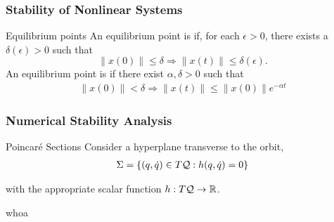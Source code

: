 \begin{frame}
  \frametitle{Stability of Nonlinear Systems}
  \begin{block}{Equilibrium points}
    An equilibrium point is  if, for each $\epsilon > 0$, there exists a $\delta(\epsilon) > 0$ such that $$\|x(0)\| \leq \delta \Rightarrow \|x(t)\| \leq \delta(\epsilon).$$
    An equilibrium point is  if there exist $\alpha, \delta > 0$ such that
    \begin{align*}
      \|x(0)\| < \delta \Rightarrow \| x(t) \| \leq \| x(0) \| e^{-\alpha t}
    \end{align*}
  \end{block}
\end{frame}

\begin{frame}
  \frametitle{Numerical Stability Analysis}
  \begin{block}{Poincar\'e Sections}
    Consider a hyperplane transverse to the orbit,
    \begin{align*}
      \Sigma = \left\{ (q, {\dot q}) \in T\mathcal{Q} : h(q, \dot q) = 0\right\}
    \end{align*}
  \end{block}
  with the appropriate scalar function $h : T\mathcal{Q} \to \mathbb{R}$.
\end{frame}

\begin{frame}
  whoa
\end{frame}
